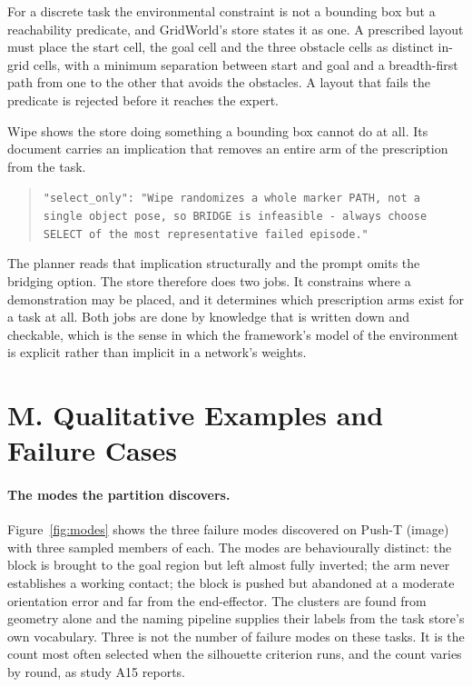 \documentclass[letterpaper]{article}
\begin{document}
For a discrete task the environmental constraint is not a bounding box but a
reachability predicate, and GridWorld's store states it as one. A prescribed layout must
place the start cell, the goal cell and the three obstacle cells as distinct in-grid
cells, with a minimum separation between start and goal and a breadth-first path from
one to the other that avoids the obstacles. A layout that fails the predicate is
rejected before it reaches the expert.

Wipe shows the store doing something a bounding box cannot do at all. Its document
carries an implication that removes an entire arm of the prescription from the task.

\begin{quote}
\raggedright
\texttt{"select\_only": "Wipe randomizes a whole marker PATH, not a single object pose,
so BRIDGE is infeasible - always choose SELECT of the most representative failed
episode."}
\end{quote}

The planner reads that implication structurally and the prompt omits the bridging
option. The store therefore does two jobs. It constrains where a demonstration may be
placed, and it determines which prescription arms exist for a task at all. Both jobs are
done by knowledge that is written down and checkable, which is the sense in which the
framework's model of the environment is explicit rather than implicit in a network's
weights.

\section{M. Qualitative Examples and Failure Cases}

\paragraph{The modes the partition discovers.} Figure~\ref{fig:modes} shows the three
failure modes discovered on Push-T (image) with three sampled members of each. The modes
are behaviourally distinct: the block is brought to the goal region but left almost fully
inverted; the arm never establishes a working contact; the block is pushed but abandoned
at a moderate orientation error and far from the end-effector. The clusters are found
from geometry alone and the naming pipeline supplies their labels from the task store's
own vocabulary. Three is not the number of failure modes on these tasks. It is the count
most often selected when the silhouette criterion runs, and the count varies by round, as
study A15 reports.
\end{document}
